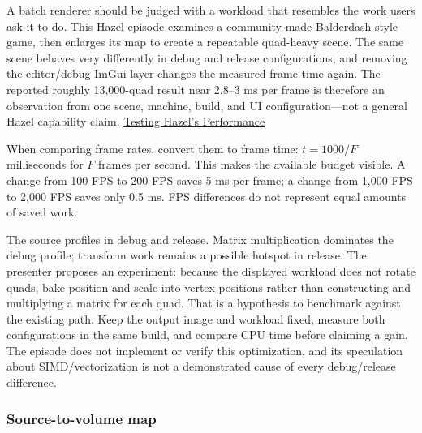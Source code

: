 \hypertarget{06-engine-ii-ch041-a-profiler-result-belongs-to-its-exact-build-and-scene}{}

A batch renderer should be judged with a workload that resembles the work users ask it to do. This Hazel episode examines a community-made Balderdash-style game, then enlarges its map to create a repeatable quad-heavy scene. The same scene behaves very differently in debug and release configurations, and removing the editor/debug ImGui layer changes the measured frame time again. The reported roughly 13,000-quad result near 2.8--3 ms per frame is therefore an observation from one scene, machine, build, and UI configuration---not a general Hazel capability claim. \href{https://www.youtube.com/watch?v=Yw7RpvmqvSE}{Testing Hazel's Performance}

When comparing frame rates, convert them to frame time: \(t=1000/F\) milliseconds for \(F\) frames per second. This makes the available budget visible. A change from 100 FPS to 200 FPS saves 5 ms per frame; a change from 1,000 FPS to 2,000 FPS saves only 0.5 ms. FPS differences do not represent equal amounts of saved work.

The source profiles  in debug and release. Matrix multiplication dominates the debug profile; transform work remains a possible hotspot in release. The presenter proposes an experiment: because the displayed workload does not rotate quads, bake position and scale into vertex positions rather than constructing and multiplying a matrix for each quad. That is a hypothesis to benchmark against the existing path. Keep the output image and workload fixed, measure both configurations in the same build, and compare CPU time before claiming a gain. The episode does not implement or verify this optimization, and its speculation about SIMD/vectorization is not a demonstrated cause of every debug/release difference.

\subsubsection{Source-to-volume map}\label{06-engine-ii-ch041-source-to-volume-map}

\hypertarget{06-engine-ii-ch041-source-to-volume-map}{}

